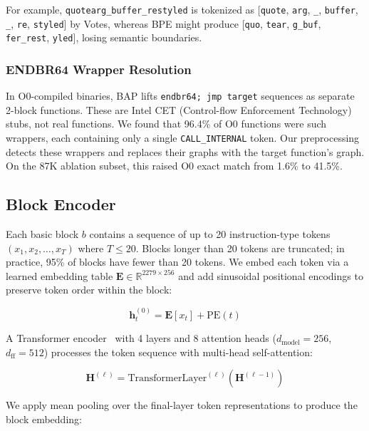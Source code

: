 \documentclass[sigconf,nonacm]{acmart}
\begin{document}
For example, \texttt{quotearg\_buffer\_restyled} is tokenized as [\texttt{quote}, \texttt{arg}, \texttt{\_}, \texttt{buffer}, \texttt{\_}, \texttt{re}, \texttt{styled}] by Votes, whereas BPE might produce [\texttt{quo}, \texttt{tear}, \texttt{g\_buf}, \texttt{fer\_rest}, \texttt{yled}], losing semantic boundaries.

\subsubsection{ENDBR64 Wrapper Resolution}

In O0-compiled binaries, BAP lifts \texttt{endbr64; jmp target} sequences as separate 2-block functions. These are Intel CET (Control-flow Enforcement Technology) stubs, not real functions. We found that 96.4\% of O0 functions were such wrappers, each containing only a single \texttt{CALL\_INTERNAL} token. Our preprocessing detects these wrappers and replaces their graphs with the target function's graph. On the 87K ablation subset, this raised O0 exact match from 1.6\% to 41.5\%.

\subsection{Block Encoder}
\label{sec:block_encoder}

Each basic block $b$ contains a sequence of up to 20 instruction-type tokens $(x_1, x_2, \ldots, x_T)$ where $T \leq 20$. Blocks longer than 20 tokens are truncated; in practice, 95\% of blocks have fewer than 20 tokens. We embed each token via a learned embedding table $\mathbf{E} \in \mathbb{R}^{2279 \times 256}$ and add sinusoidal positional encodings to preserve token order within the block:

\begin{equation}
    \mathbf{h}_t^{(0)} = \mathbf{E}[x_t] + \text{PE}(t)
\end{equation}

A Transformer encoder~\cite{vaswani2017attention} with 4 layers and 8 attention heads ($d_\text{model}{=}256$, $d_\text{ff}{=}512$) processes the token sequence with multi-head self-attention:

\begin{equation}
    \mathbf{H}^{(\ell)} = \text{TransformerLayer}^{(\ell)}(\mathbf{H}^{(\ell-1)})
\end{equation}

We apply mean pooling over the final-layer token representations to produce the block embedding:
\end{document}

